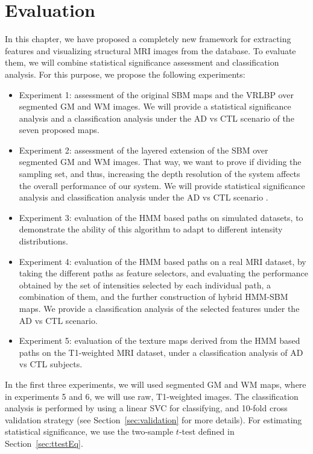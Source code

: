 \section{Evaluation}
In this chapter, we have proposed a completely new framework for extracting features and visualizing structural \ac{MRI} images from the \adnimri{} database. To evaluate them, we will combine statistical significance assessment and classification analysis. For this purpose, we propose the following experiments: 
\begin{itemize}
	\item Experiment 1: assessment of the original \ac{SBM} maps and the \ac{VRLBP} over segmented \ac{GM} and \ac{WM} images. We will provide a statistical significance analysis and a classification analysis under the \ac{AD} vs \ac{CTL} scenario of the seven proposed maps. 
	\item Experiment 2: assessment of the layered extension of the \ac{SBM} over segmented \ac{GM} and \ac{WM} images. That way, we want to prove if dividing the sampling set, and thus, increasing the depth resolution of the system affects the overall performance of our system. We will provide statistical significance analysis and classification analysis under the \ac{AD} vs \ac{CTL} scenario . 
	\item Experiment 3: evaluation of the \ac{HMM} based paths on simulated datasets, to demonstrate the ability of this algorithm to adapt to different intensity distributions. 
	\item Experiment 4: evaluation of the \ac{HMM} based paths on a real \ac{MRI} dataset, by taking the different paths as feature selectors, and evaluating the performance obtained by the set of intensities selected by each individual path, a combination of them, and the further construction of hybrid \ac{HMM}-\ac{SBM} maps. We provide a classification analysis of the selected features under the \ac{AD} vs \ac{CTL} scenario. 
	\item Experiment 5: evaluation of the texture maps derived from the \ac{HMM} based paths on the T1-weighted \ac{MRI} dataset, under a classification analysis of \ac{AD} vs \ac{CTL} subjects. 
\end{itemize}

In the first three experiments, we will used segmented \ac{GM} and \ac{WM} maps, where in experiments 5 and 6, we will use raw, T1-weighted images. The classification analysis is performed by using a linear \ac{SVC} for classifying, and 10-fold cross validation strategy (see Section~\ref{sec:validation} for more details). For estimating statistical significance, we use the two-sample $t$-test defined in Section~\ref{sec:ttestEq}. 


